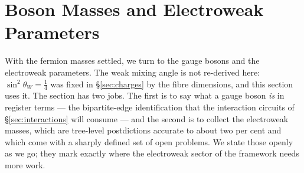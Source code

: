 %

\section{Boson Masses and Electroweak Parameters}
\label{sec:boson-masses}

With the fermion masses settled, we turn to the gauge bosons and the electroweak parameters. The
weak mixing angle is not re-derived here: $\sin^2\theta_W = \tfrac14$ was fixed in
\S\ref{sec:charges} by the fibre dimensions, and this section uses it. The section has two jobs. The
first is to say what a gauge boson \emph{is} in register terms --- the bipartite-edge identification
that the interaction circuits of \S\ref{sec:interactions} will consume --- and the second is to
collect the electroweak masses, which are tree-level postdictions accurate to about two per cent and
which come with a sharply defined set of open problems. We state those openly as we go; they mark
exactly where the electroweak sector of the framework needs more work.

